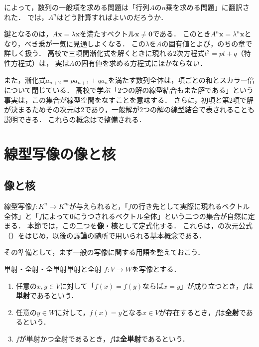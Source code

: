 \begin{mycolumn}
によって，数列の一般項を求める問題は「行列$A$の$n$乗を求める問題」に翻訳された．
では，$A^n$はどう計算すればよいのだろうか．

鍵となるのは，$A\bm{x} = \lambda \bm{x}$を満たすベクトル$\bm{x} \ne \bm{0}$である．
このとき$A^n \bm{x} = \lambda^n \bm{x}$となり，べき乗が一気に見通しよくなる．
この$\lambda$を$A$の固有値とよび，のちの章で詳しく扱う．
高校で三項間漸化式を解くときに現れる$2$次方程式$t^2 = pt + q$（特性方程式）は，
実は$A$の固有値を求める方程式にほかならない．

また，漸化式$a_{n+2} = p a_{n+1} + q a_n$を満たす数列全体は，項ごとの和とスカラー倍について閉じている．
高校で学ぶ「$2$つの解の線型結合もまた解である」という事実は，この集合が線型空間をなすことを意味する．
さらに，初項と第$2$項で解が決まるためその次元は$2$であり，一般解が$2$つの解の線型結合で表されることも説明できる．
これらの概念はで整備される．
\end{mycolumn}

\section{線型写像の像と核}

\subsection{像と核}

線型写像$f \colon K^n \to K^m$が与えられると，「$f$の行き先として実際に現れるベクトル全体」と「$f$によって$\bm{0}$にうつされるベクトル全体」という二つの集合が自然に定まる．
本節では，この二つを\textbf{像}・\textbf{核}として定式化する．
これらは，の次元公式（）をはじめ，以後の議論の随所で用いられる基本概念である．

その準備として，まず一般の写像に関する用語を整えておこう．

\begin{definition}{単射・全射・全単射}{単射と全射}
  $f \colon V \to W$を写像とする．
  \begin{enumerate}[label=(\roman*),leftmargin=3.2em]
    \item 任意の$x, y \in V$に対して「$f(x) = f(y)$ならば$x = y$」が成り立つとき，$f$は\textbf{単射}であるという．
    \item 任意の$y \in W$に対して，$f(x) = y$となる$x \in V$が存在するとき，$f$は\textbf{全射}であるという．
    \item $f$が単射かつ全射であるとき，$f$は\textbf{全単射}であるという．
  \end{enumerate}
\end{definition}

